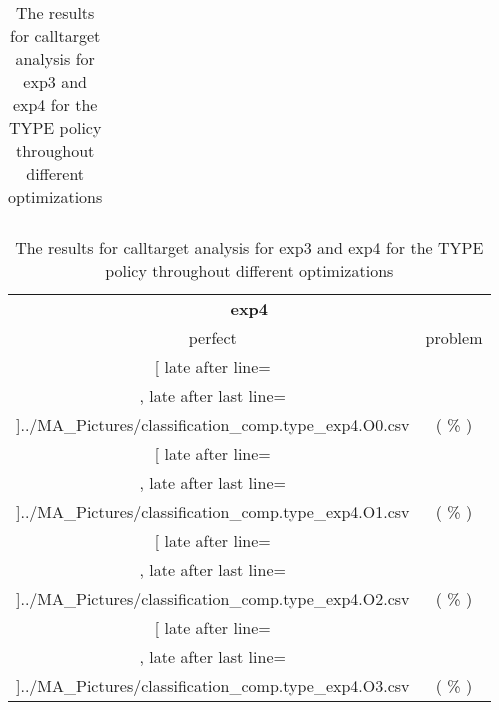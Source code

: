 \begin{table}[!htbp]
{\begin{tabular}{l|c|c|c}
    	\end{tabular}

	\begin{tabular}{|c|c}%

	\toprule
	\multicolumn{2}{c}{\bfseries exp4}\\
	
	perfect &  problem %
	\\\midrule
	\csvreader[ late after line=\\, late after last line=\\\midrule]{../MA_Pictures/classification_comp.type_exp4.O0.csv}{
}
	{\csvcolxiii ( \csvcolxiv \% ) & \csvcolxv ( \csvcolxvi \% )}%



\multicolumn{1}{c}{} 
	\\\midrule
	\csvreader[ late after line=\\, late after last line=\\\midrule]{../MA_Pictures/classification_comp.type_exp4.O1.csv}{
}
	{\csvcolxiii ( \csvcolxiv \% ) & \csvcolxv ( \csvcolxvi \% )}%
	
	
\multicolumn{1}{c}{}
	\\\midrule
	\csvreader[ late after line=\\, late after last line=\\\midrule]{../MA_Pictures/classification_comp.type_exp4.O2.csv}{
}
	{\csvcolxiii ( \csvcolxiv \% ) & \csvcolxv ( \csvcolxvi \% )}%
	

\multicolumn{1}{c}{}
	\\\midrule
	\csvreader[ late after line=\\, late after last line=\\\bottomrule]{../MA_Pictures/classification_comp.type_exp4.O3.csv}{
}
	{\csvcolxiii ( \csvcolxiv \% ) & \csvcolxv ( \csvcolxvi \% )}%


    	\end{tabular}
}
		\caption {The results for calltarget analysis for exp3 and exp4 for the TYPE policy throughout different optimizations}
		\label{tbl:CTdestinterexp34TYPE}
\end{table}



